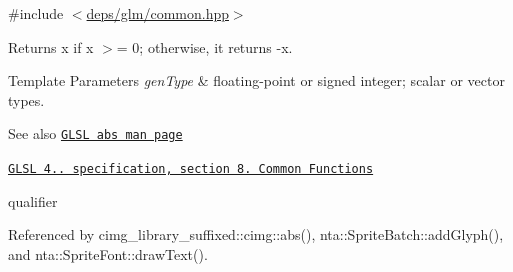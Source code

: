 {\ttfamily \#include $<$\hyperlink{common_8hpp}{deps/glm/common.\+hpp}$>$}

Returns x if x $>$= 0; otherwise, it returns -\/x.


\begin{DoxyTemplParams}{Template Parameters}
{\em gen\+Type} & floating-\/point or signed integer; scalar or vector types.\\
\hline
\end{DoxyTemplParams}
\begin{DoxySeeAlso}{See also}
\href{http://www.opengl.org/sdk/docs/manglsl/xhtml/abs.xml}{\tt G\+L\+SL abs man page} 

\href{http://www.opengl.org/registry/doc/GLSLangSpec.4.20.8.pdf}{\tt G\+L\+SL 4.. specification, section 8. Common Functions} 

qualifier 
\end{DoxySeeAlso}


Referenced by cimg\+\_\+library\+\_\+suffixed\+::cimg\+::abs(), nta\+::\+Sprite\+Batch\+::add\+Glyph(), and nta\+::\+Sprite\+Font\+::draw\+Text().

